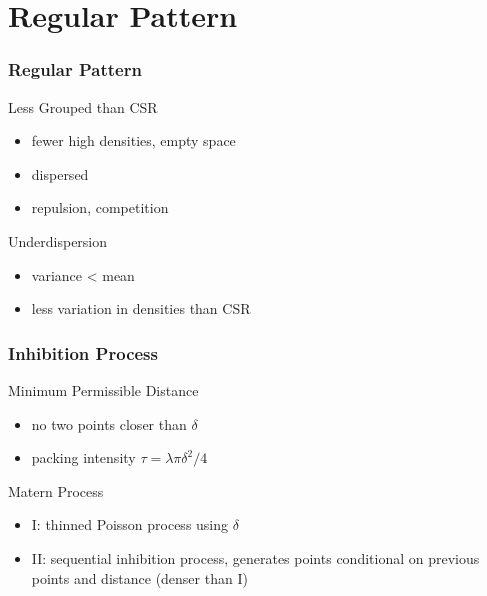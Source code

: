 \documentclass[nototal,handout]{beamer}
\begin{document}
\section{Regular Pattern}
\begin{frame}
  \frametitle{Regular Pattern}
  \begin{block}{Less Grouped than CSR}
    \begin{itemize}
      \item fewer high densities, empty space
      \item dispersed
      \item repulsion, competition
    \end{itemize}
   \end{block}
 \begin{block}{Underdispersion}
    \begin{itemize}
      \item variance < mean
      \item less variation in densities than CSR
    \end{itemize}
   \end{block}
\end{frame}


\begin{frame}
  \frametitle{Inhibition Process}
  \begin{block}{Minimum Permissible Distance}
    \begin{itemize}
      \item no two points closer than $\delta$
      \item packing intensity $\tau = \lambda \pi \delta^2/4$
    \end{itemize}
   \end{block}
  \begin{block}{Matern Process}
    \begin{itemize}
      \item I: thinned Poisson process using $\delta$
      \item II: sequential inhibition process,  generates points conditional on
	previous points and distance (denser than I)
    \end{itemize}
  \end{block}
 \end{frame}
\end{document}
